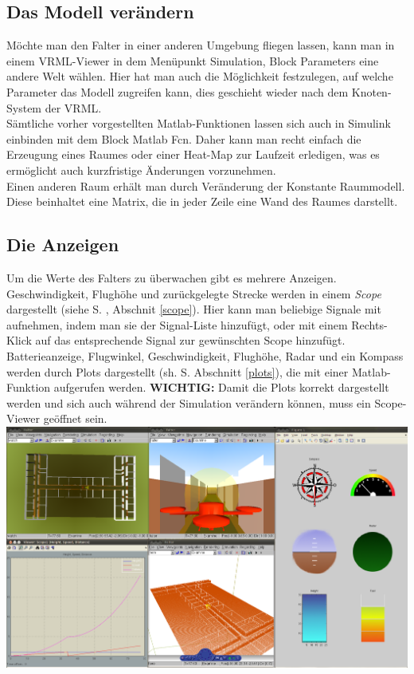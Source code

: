 \documentclass[titlepage, a4paper, ngerman]{article}
\begin{document}
\subsection{Das Modell verändern}
Möchte man den Falter in einer anderen Umgebung fliegen lassen, kann man in einem VRML-Viewer in dem Menüpunkt Simulation, Block Parameters eine andere Welt wählen. Hier hat man auch die Möglichkeit festzulegen, auf welche Parameter das Modell zugreifen kann, dies geschieht wieder nach dem Knoten-System der VRML.\\
Sämtliche vorher vorgestellten Matlab-Funktionen lassen sich auch in Simulink einbinden mit dem Block \glqq Matlab Fcn\grqq. Daher kann man recht einfach die Erzeugung eines Raumes oder einer Heat-Map zur Laufzeit erledigen, was es ermöglicht auch kurzfristige Änderungen vorzunehmen.\\
Einen anderen Raum erhält man durch Veränderung der Konstante Raummodell. Diese beinhaltet eine Matrix, die in jeder Zeile eine Wand des Raumes darstellt.

\subsection{Die Anzeigen}
Um die Werte des Falters zu überwachen gibt es mehrere Anzeigen. \\
Geschwindigkeit, Flughöhe und zurückgelegte Strecke werden in einem {\em Scope} dargestellt  (siehe S. \pageref{scope}, Abschnit \ref{scope}). Hier kann man beliebige Signale mit aufnehmen, indem man sie der Signal-Liste hinzufügt, oder mit einem Rechts-Klick auf das entsprechende Signal zur gewünschten Scope hinzufügt. \\
Batterieanzeige, Flugwinkel, Geschwindigkeit, Flughöhe, Radar und ein Kompass werden durch Plots dargestellt (sh. S. \pageref{plots} Abschnitt \ref{plots}), die mit einer Matlab-Funktion aufgerufen werden.
{\bf WICHTIG:} Damit die Plots korrekt dargestellt werden und sich auch während der Simulation verändern können, muss ein Scope-Viewer geöffnet sein.\\
\includegraphics[width=\linewidth]{Bildschirmfoto.png}
%
%
\newpage
\setcounter{secnumdepth}{1}
\appendix
\end{document}
